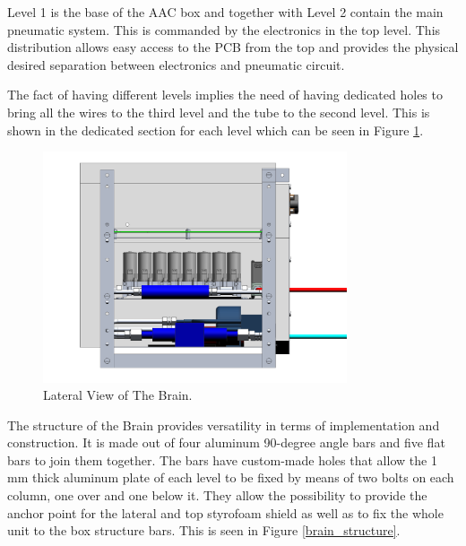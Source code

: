 Level 1 is the base of the AAC box and together with Level 2 contain the main pneumatic system. This is commanded by the electronics in the top level. This distribution allows easy access to the PCB from the top and provides the physical desired separation between electronics and pneumatic circuit. 

The fact of having different levels implies the need of having dedicated holes to bring all the wires to the third level and the tube to the second level. This is shown in the dedicated section for each level which can be seen in Figure \ref{brain_lateral}.

\begin{figure}[H]
    \centering
    \includegraphics[width=0.8\textwidth]{4-experiment-design/img/Mechanical/Brain_Lateral.png}
    \caption{Lateral View of The Brain.}
    \label{brain_lateral}
\end{figure}

\smallskip
The structure of the Brain provides versatility in terms of implementation and construction. It is made out of four aluminum 90-degree angle bars and five flat bars to join them together. The bars have custom-made holes that allow the 1 mm thick aluminum plate of each level to be fixed by means of two bolts on each column, one over and one below it. They allow the possibility to provide the anchor point for the lateral and top styrofoam shield as well as to fix the whole unit to the box structure bars. This is seen in Figure \ref{brain_structure}. 

